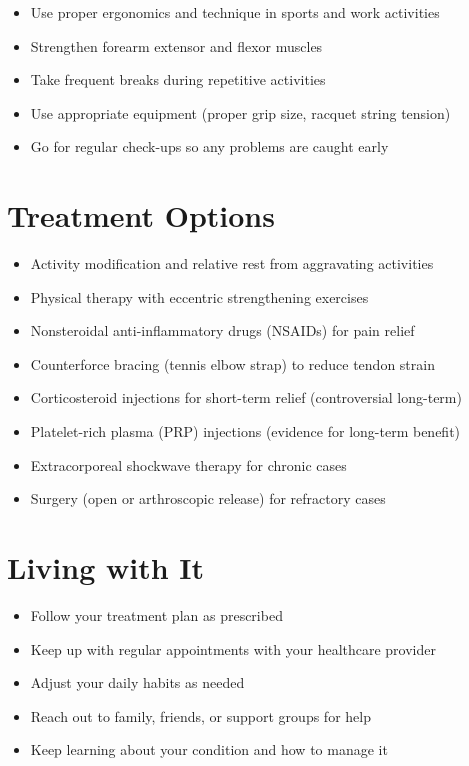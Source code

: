 \begin{itemize}[noitemsep]
  \item Use proper ergonomics and technique in sports and work activities
  \item Strengthen forearm extensor and flexor muscles
  \item Take frequent breaks during repetitive activities
  \item Use appropriate equipment (proper grip size, racquet string tension)
  \item Go for regular check-ups so any problems are caught early
\end{itemize}

\section{Treatment Options}

\begin{itemize}[noitemsep]
  \item Activity modification and relative rest from aggravating activities
  \item Physical therapy with eccentric strengthening exercises
  \item Nonsteroidal anti-inflammatory drugs (NSAIDs) for pain relief
  \item Counterforce bracing (tennis elbow strap) to reduce tendon strain
  \item Corticosteroid injections for short-term relief (controversial long-term)
  \item Platelet-rich plasma (PRP) injections (evidence for long-term benefit)
  \item Extracorporeal shockwave therapy for chronic cases
  \item Surgery (open or arthroscopic release) for refractory cases
\end{itemize}

\section{Living with It}

\begin{itemize}[noitemsep]
  \item Follow your treatment plan as prescribed
  \item Keep up with regular appointments with your healthcare provider
  \item Adjust your daily habits as needed
  \item Reach out to family, friends, or support groups for help
  \item Keep learning about your condition and how to manage it
\end{itemize}

